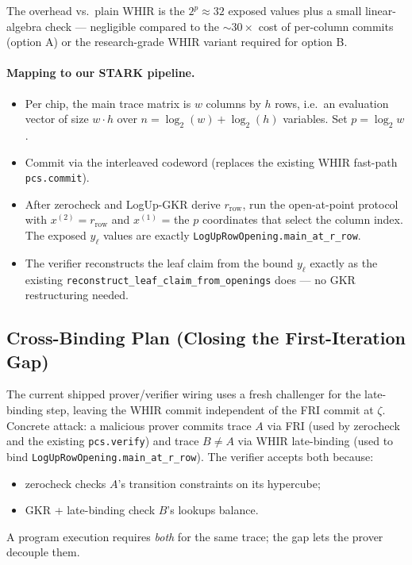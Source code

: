 The overhead vs.~plain WHIR is the $2^p \approx 32$ exposed values
plus a small linear-algebra check --- negligible compared to the
$\sim 30\times$ cost of per-column commits (option A) or the
research-grade WHIR variant required for option B.

\paragraph{Mapping to our STARK pipeline.}
\begin{itemize}
  \item Per chip, the main trace matrix is $w$ columns by $h$ rows,
        i.e.~an evaluation vector of size $w \cdot h$ over
        $n = \log_2(w) + \log_2(h)$ variables.  Set $p = \log_2 w$.
  \item Commit via the interleaved codeword (replaces the existing
        WHIR fast-path \texttt{pcs.commit}).
  \item After zerocheck and LogUp-GKR derive $r_{\mathrm{row}}$, run
        the open-at-point protocol with $x^{(2)} = r_{\mathrm{row}}$
        and $x^{(1)}$ = the $p$ coordinates that select the column
        index.  The exposed $y_\ell$ values are exactly
        \texttt{LogUpRowOpening.main\_at\_r\_row}.
  \item The verifier reconstructs the leaf claim from the
        bound $y_\ell$ exactly as the existing
        \texttt{reconstruct\_leaf\_claim\_from\_openings} does ---
        no GKR restructuring needed.
\end{itemize}

\subsection{Cross-Binding Plan (Closing the First-Iteration Gap)}
\label{sec:cross-binding-plan}

The current shipped prover/verifier wiring uses a fresh challenger
for the late-binding step, leaving the WHIR commit independent of
the FRI commit at $\zeta$.  Concrete attack: a malicious prover
commits trace $A$ via FRI (used by zerocheck and the existing
\texttt{pcs.verify}) and trace $B \neq A$ via WHIR late-binding
(used to bind \texttt{LogUpRowOpening.main\_at\_r\_row}).  The
verifier accepts both because:
\begin{itemize}
  \item zerocheck checks $A$'s transition constraints on its
        hypercube;
  \item GKR + late-binding check $B$'s lookups balance.
\end{itemize}
A program execution requires \emph{both} for the same trace; the
gap lets the prover decouple them.

